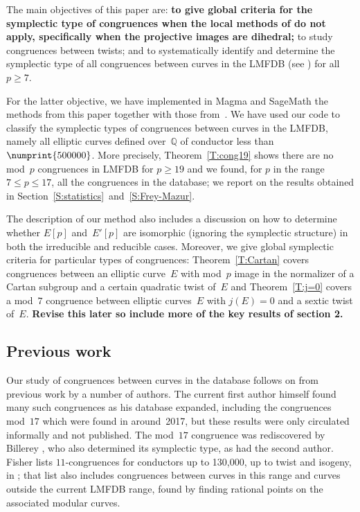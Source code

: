\documentclass[12pt, reqno]{amsart}
\newcommand{\Q}{\mathbb{Q}}
\newcommand{\rhobar}{{\overline{\rho}}}
\numberwithin{equation}{section}
\theoremstyle{definition}
\theoremstyle{remark}
\newcommand{\Sage}{{\sc SageMath}}
\newcommand{\Magma}{{\sc Magma}}
\begin{document}
The main objectives of this paper are: {\bf to give global criteria for the
symplectic type of congruences when the local methods of \cite{FKSym}
do not apply, specifically when the projective images are dihedral;} to
study congruences between twists; and to systematically identify and
determine the symplectic type of all congruences between curves in the
LMFDB (see \cite{lmfdb})
for all~$p\ge7$.


For the latter objective, we have implemented in {\Magma} \cite{magma}
and {\Sage} \cite{sage} the methods from this paper together with
those from~\cite{FKSym}. We have used our code to classify the
symplectic types of congruences between curves in the LMFDB, namely
all elliptic curves defined over~$\Q$ of conductor less
than~$\numprint{500000}$. More precisely, Theorem~\ref{T:cong19} shows
there are no mod~$p$ congruences in LMFDB for $p \geq 19$ and we
found, for $p$ in the range $7 \leq p \leq 17$, all the congruences in
the database; we report on the results obtained in
Section~\ref{S:statistics}~and~\ref{S:Frey-Mazur}.

The description of our method also includes a discussion on how to
determine whether $E[p]$ and~$E'[p]$ are isomorphic (ignoring the
symplectic structure) in both the irreducible and reducible
cases. Moreover, we give global symplectic criteria for particular
types of congruences: Theorem~\ref{T:Cartan} covers congruences
between an elliptic curve~$E$ with mod~$p$ image in the normalizer of
a Cartan subgroup and a certain quadratic twist of~$E$ and
Theorem~\ref{T:j=0} covers a mod~$7$ congruence between elliptic
curves~$E$ with $j(E)=0$ and a sextic twist of~$E$.
\textbf{Revise this later so include more of the key results of
  section 2.}

\subsection{Previous work}
Our study of congruences between curves in the database follows on
from previous work by a number of authors.  The current first author
himself found many such congruences as his database expanded,
including the congruences mod~$17$ which were found in around~2017,
but these results were only circulated informally and not published.
The mod~$17$ congruence was rediscovered by Billerey
\cite{Billerey17}, who also determined its symplectic type, as had the
second author.  Fisher lists $11$-congruences for conductors up to
130,000, up to twist and isogeny, in \cite{FisherList}; that list also
includes congruences between curves in this range and curves outside
the current LMFDB range, found by finding rational points on the associated modular
curves.
\end{document}
